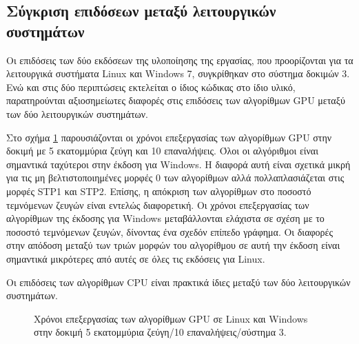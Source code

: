 \subsection{Σύγκριση επιδόσεων μεταξύ λειτουργικών συστημάτων}
\noindent Οι επιδόσεις των δύο εκδόσεων της υλοποίησης της εργασίας, που προορίζονται για τα λειτουργικά συστήματα Linux και Windows 7, συγκρίθηκαν στο σύστημα δοκιμών 3. Ενώ και στις δύο περιπτώσεις εκτελείται ο ίδιος κώδικας στο ίδιο υλικό, παρατηρούνται αξιοσημείωτες διαφορές στις επιδόσεις των αλγορίθμων GPU μεταξύ των δύο λειτουργικών συστημάτων.

Στο σχήμα \ref{gpuoscomp} παρουσιάζονται οι χρόνοι επεξεργασίας των αλγορίθμων GPU στην δοκιμή με 5 εκατομμύρια ζεύγη και 10 επαναλήψεις. Όλοι οι αλγόριθμοι είναι σημαντικά ταχύτεροι στην έκδοση για Windows. Η διαφορά αυτή είναι σχετικά μικρή για τις μη βελτιστοποιημένες μορφές 0 των αλγορίθμων αλλά πολλαπλασιάζεται στις μορφές STP1 και STP2. Επίσης, η απόκριση των αλγορίθμων στο ποσοστό τεμνόμενων ζευγών είναι εντελώς διαφορετική. Οι χρόνοι επεξεργασίας των αλγορίθμων της έκδοσης για Windows μεταβάλλονται ελάχιστα σε σχέση με το ποσοστό τεμνόμενων ζευγών, δίνοντας ένα σχεδόν επίπεδο γράφημα. Οι διαφορές στην απόδοση μεταξύ των τριών μορφών του αλγορίθμου σε αυτή την έκδοση είναι σημαντικά μικρότερες από αυτές σε όλες τις εκδόσεις για Linux.

Οι επιδόσεις των αλγορίθμων CPU είναι πρακτικά ίδιες μεταξύ των δύο λειτουργικών συστημάτων. 

\begin{figure}[h!]
\begin{center}
\scalebox{1.05}
{

}
\end{center}
\caption{Χρόνοι επεξεργασίας των αλγορίθμων GPU σε Linux και Windows στην δοκιμή 5 εκατομμύρια ζεύγη/10 επαναλήψεις/σύστημα 3.}
\label{gpuoscomp}
\end{figure}

\UndefineShortVerb{\!}